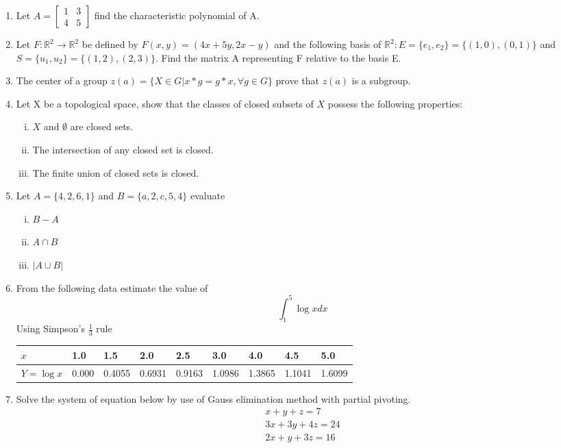 \begin{enumerate}
	\item Let $ A  = \begin{bmatrix}1 & 3\\
	4 & 5\end{bmatrix}$ find the characteristic polynomial of A. 
   \item Let $F:\mathbb{R}^{2} \rightarrow \mathbb{R}^{2}$ be defined by $F(x,y) = (4x + 5y, 2x-y)$ and the following basis of $\mathbb{R}^{2}:E = \{e_{1}, e_{2}\} = \{(1,0), (0,1)\}$ and $S = \{u_{1},u_{2}\}= \{(1,2),(2,3)\}$. Find the matrix A representing F relative to the basis E. 
   \item The center of a group $z(a) = \{X\in G|x*g = g*x, \forall g\in G\}$ prove that $z(a)$ is a subgroup. 
   \item Let X be a topological space, show that the classes of closed subsets of $X$ possess the following properties:
   \begin{enumerate}[(i)]
   	\item $X$ and $\emptyset$ are closed sets. 
   	\item The intersection of any closed set is closed. 
   	\item The finite union of closed sets is closed. 
   \end{enumerate}
\item Let $A = \{4,2,6,1\}$ and $B = \{a,2,c,5,4\}$ evaluate
\begin{enumerate}[(i)]
	\item $B-A$ 
	\item $A \cap B$ 
	\item $|A\cup B|$ 
\end{enumerate}
\item From the following data estimate the value of $$\int_{1}^{5} \log x dx$$
Using Simpson's $\frac{1}{3}$ rule
\begin{table}[h!]
	\centering
	\begin{tabular}{|l|l|l|l|l|l|l|l|l|}
		\hline
		$x$          & 1.0   & 1.5    & 2.0    & 2.5    & 3.0    & 4.0    & 4.5    & 5.0    \\ \hline
		$Y = \log x$ & 0.000 & 0.4055 & 0.6931 & 0.9163 & 1.0986 & 1.3865 & 1.1041 & 1.6099 \\ \hline
	\end{tabular}
\end{table} 
\item Solve the system of equation below by use of Gauss elimination method
with partial pivoting.
\begin{align*}
	x + y + z =7\\
	3x + 3y + 4z = 24\\
	2x + y + 3z = 16
\end{align*}


\end{enumerate}